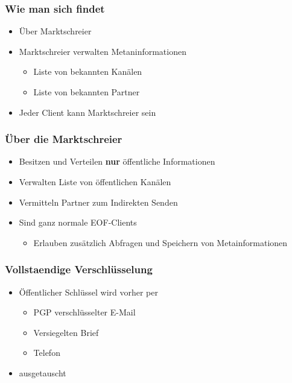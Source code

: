 \documentclass{beamer}
\begin{document}
\frame
{
  \frametitle{Wie man sich findet}

  \begin{itemize}
  \item \"Uber Marktschreier
  \pause
  \item Marktschreier verwalten Metaninformationen
  \pause
  \begin{itemize}
  \item Liste von bekannten Kan\"alen
  \pause
  \item Liste von bekannten Partner
  \pause
  \end{itemize}
  \item Jeder Client kann Marktschreier sein
  \end{itemize}
}

\frame
{
  \frametitle{\"Uber die Marktschreier}

  \begin{itemize}
  \item Besitzen und Verteilen \textbf{nur} \"offentliche Informationen
  \pause
  \item Verwalten Liste von \"offentlichen Kan\"alen
  \pause
  \item Vermitteln Partner zum Indirekten Senden
  \pause
  \item Sind ganz normale EOF-Clients
  \pause
  \begin{itemize}
  \item Erlauben zus\"atzlich Abfragen und Speichern von Metainformationen
  \end{itemize}
  \end{itemize}
}

\frame
{
  \frametitle{Vollstaendige Verschl\"usselung}

  \begin{itemize}
  \item \"Offentlicher Schl\"ussel wird vorher per
  \pause
  \begin{itemize}
  \item PGP verschl\"usselter E-Mail
  \pause
  \item Versiegelten Brief
  \pause
  \item Telefon
  \end{itemize}
  \item ausgetauscht
  \end{itemize}
}
\end{document}
